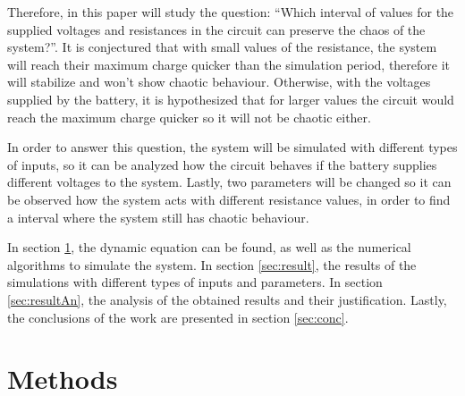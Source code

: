 Therefore, in this paper will study the question: ``Which interval of values for the supplied voltages and resistances in the circuit can preserve the chaos of the system?''. It is conjectured that with small values of the resistance, the system will reach their maximum charge quicker than the simulation period, therefore it will stabilize and won't show chaotic behaviour. Otherwise, with the voltages supplied by the battery, it is hypothesized that for larger values the circuit would reach the maximum charge quicker so it will not be chaotic either.

In order to answer this question, the system will be simulated with different types of inputs, so it can be analyzed how the circuit behaves if the battery supplies different voltages to the system. Lastly, two parameters will be changed so it can be observed how the system acts with different resistance values, in order to find a interval where the system still has chaotic behaviour.

In section \ref{sec:meth}, the dynamic equation can be found, as well as the numerical algorithms to simulate the system. In section \ref{sec:result}, the results of the simulations with different types of inputs and parameters. In section \ref{sec:resultAn}, the analysis of the obtained results and their justification. Lastly, the conclusions of the work are presented in section \ref{sec:conc}.

\section{Methods}\label{sec:meth}
